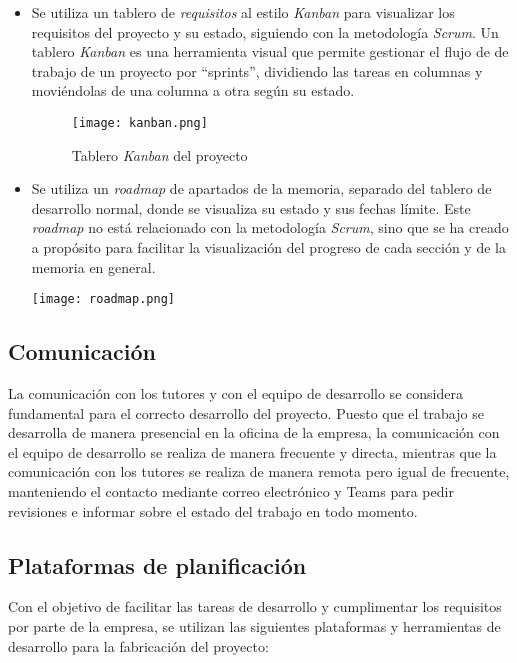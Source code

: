 \begin{itemize}
	\item Se utiliza un tablero de \textit{requisitos} al estilo \textit{Kanban} para visualizar
		los requisitos del proyecto y su estado, siguiendo con la metodología \textit{Scrum}.
		Un tablero \textit{Kanban} es una herramienta visual que permite gestionar el flujo de
		de trabajo de un proyecto por ``sprints'', dividiendo las tareas en columnas y moviéndolas
		de una columna a otra según su estado.

		\begin{figure}[H]
			\centering
			\texttt{[image: kanban.png]}
			\caption{Tablero \textit{Kanban} del proyecto}
			\label{fig:kanban}
		\end{figure}
	\item Se utiliza un \textit{roadmap} de apartados de la memoria, separado del tablero de desarrollo
		normal, donde se visualiza su estado y sus fechas límite. Este \textit{roadmap} no está
		relacionado con la metodología \textit{Scrum}, sino que se ha creado a propósito para facilitar
		la visualización del progreso de cada sección y de la memoria en general.

		\begin{minipage}{\linewidth}
			\centering
			\texttt{[image: roadmap.png]}
		\end{minipage}
\end{itemize}


\subsection{Comunicación}\label{subsec:comunicación}
La comunicación con los tutores y con el equipo de desarrollo se considera fundamental para el
correcto desarrollo del proyecto. Puesto que el trabajo se desarrolla de manera presencial en
la oficina de la empresa, la comunicación con el equipo de desarrollo se realiza de manera
frecuente y directa, mientras que la comunicación con los tutores se realiza de manera remota
pero igual de frecuente, manteniendo el contacto mediante correo electrónico y Teams para
pedir revisiones e informar sobre el estado del trabajo en todo momento.

\subsection{Plataformas de planificación}\label{subsec:plataformas}
Con el objetivo de facilitar las tareas de desarrollo y cumplimentar los requisitos por parte
de la empresa, se utilizan las siguientes plataformas y herramientas de desarrollo para la
fabricación del proyecto:

